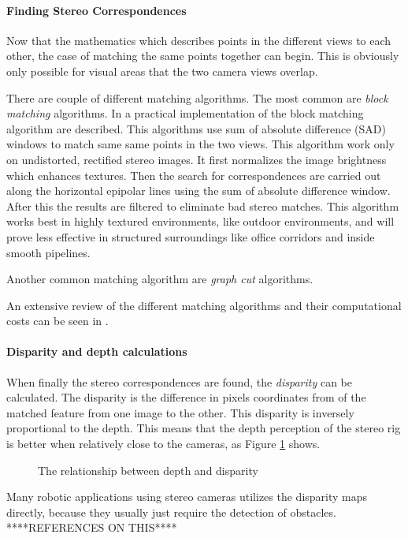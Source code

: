 \paragraph{Finding Stereo Correspondences}
Now that the mathematics which describes points in the different views to each other, the
case of matching the same points together can begin. This is obviously only possible for
visual areas that the two camera views overlap. 

There are couple of different matching algorithms. The most common are \emph{block
matching} algorithms. In \cite{konolige} a practical implementation of the block
matching algorithm are described. This algorithms use sum of absolute difference (SAD) windows to match same
same points in the two views. This algorithm work only on undistorted, rectified stereo
images. It first normalizes the image brightness which enhances textures. Then the search
for correspondences are carried out along the horizontal epipolar lines using the sum of
absolute difference window. After this the results are filtered to eliminate bad stereo
matches. This algorithm works best in highly textured environments, like outdoor
environments, and will prove less effective in structured surroundings like office
corridors and inside smooth pipelines. 

Another common matching algorithm are \emph{graph cut} algorithms. 

An extensive review of the different matching algorithms and their computational costs
can be seen in \cite{stereo-algorithms}.


\paragraph{Disparity and depth calculations}
When finally the stereo correspondences are found, the \emph{disparity} can be calculated.
The disparity is the difference in pixels coordinates from of the matched feature from one
image to the other. This disparity is inversely proportional to the depth. This means that
the depth perception of the stereo rig is better when relatively close to the cameras, as
Figure \ref{chap2:fig-disparity-depth} shows.
\begin{figure}[htbp]
    \centering
    \caption{The relationship between depth and disparity}
    \label{chap2:fig-disparity-depth}
\end{figure}

Many robotic applications using stereo cameras utilizes the disparity maps directly,
because they usually just require the detection of obstacles. ****REFERENCES ON THIS****

